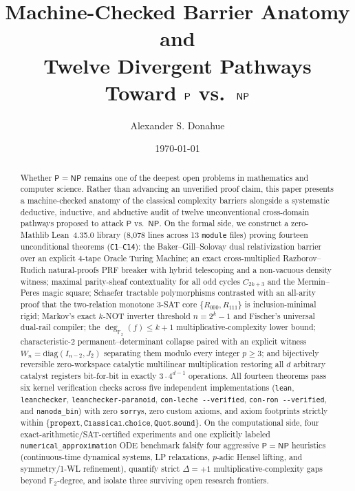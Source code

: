 \documentclass[11pt,reqno]{amsart}
\title[Machine-Checked Barrier Anatomy and Twelve Pathways Toward P vs.\ NP]{%
  Machine-Checked Barrier Anatomy and\\
  Twelve Divergent Pathways Toward $\PP$ vs.\ $\NP$%
}
\author{Alexander S. Donahue}
\date{\today}
\newcommand{\code}[1]{\texttt{\nolinkurl{#1}}}
\theoremstyle{definition}
\newcommand{\F}{\mathbb{F}}
\newcommand{\PP}{\mathsf{P}}
\newcommand{\NP}{\mathsf{NP}}
\begin{document}
\begin{abstract}
Whether $\PP = \NP$ remains one of the deepest open problems in mathematics and
computer science. Rather than advancing an unverified proof claim, this paper presents
a machine-checked anatomy of the classical complexity barriers alongside a systematic
deductive, inductive, and abductive audit of twelve unconventional cross-domain pathways
proposed to attack $\PP$ vs.\ $\NP$. On the formal side, we construct a zero-Mathlib
Lean~4.35.0 library (8,078 lines across 13 \texttt{module} files) proving fourteen
unconditional theorems (\texttt{C1}--\texttt{C14}): the Baker--Gill--Solovay dual
relativization barrier over an explicit 4-tape Oracle Turing Machine; an exact
cross-multiplied Razborov--Rudich natural-proofs PRF breaker with hybrid telescoping
and a non-vacuous density witness; maximal parity-sheaf contextuality for all odd
cycles $C_{2k+3}$ and the Mermin--Peres magic square; Schaefer tractable polymorphisms
contrasted with an all-arity proof that the two-relation monotone 3-SAT core
$\{R_{000}, R_{111}\}$ is inclusion-minimal rigid; Markov's exact $k$-NOT inverter
threshold $n = 2^k - 1$ and Fischer's universal dual-rail compiler; the
$\deg_{\F_2}(f) \le k+1$ multiplicative-complexity lower bound; characteristic-2
permanent--determinant collapse paired with an explicit witness $W_n = \mathrm{diag}(I_{n-2}, J_2)$
separating them modulo every integer $p \ge 3$; and bijectively reversible
zero-workspace catalytic multilinear multiplication restoring all $d$ arbitrary
catalyst registers bit-for-bit in exactly $3 \cdot 4^{d-1}$ operations. All fourteen
theorems pass six kernel verification checks across five independent implementations
(\texttt{lean}, \texttt{leanchecker}, \texttt{leanchecker-paranoid},
\texttt{con-leche -{}-verified}, \texttt{con-ron -{}-verified}, and \texttt{nanoda\_bin})
with zero \texttt{sorry}s, zero custom axioms, and axiom footprints strictly within
$\{\texttt{propext}, \texttt{Classical.choice}, \texttt{Quot.sound}\}$. On the
computational side, four exact-arithmetic/SAT-certified experiments and one explicitly
labeled \code{numerical_approximation} ODE benchmark falsify four aggressive
$\PP = \NP$ heuristics (continuous-time dynamical systems, LP relaxations, $p$-adic
Hensel lifting, and symmetry/1-WL refinement), quantify strict $\Delta = +1$
multiplicative-complexity gaps beyond $\F_2$-degree, and isolate three surviving
open research frontiers.
\end{abstract}

\maketitle
\end{document}
